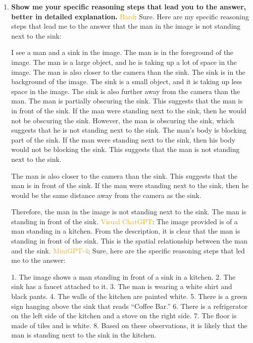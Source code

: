 \begin{enumerate}
    Therefore, the man in the image is not standing next to the sink. The man is standing in front of the sink.
    \subitem \textcolor{orange}{Visual ChatGPT}: The man is standing in front of the sink in the kitchen.
    \subitem \textcolor{orange}{MiniGPT-4}: Yes, the man is standing next to the sink.
    \item \textbf{Show me your specific reasoning steps that lead you to the answer, better in detailed explanation.}
    \subitem \textcolor{orange}{Bard}: 
    Sure. Here are my specific reasoning steps that lead me to the answer that the man in the image is not standing next to the sink:
    
    I see a man and a sink in the image.
    The man is in the foreground of the image. The man is a large object, and he is taking up a lot of space in the image. The man is also closer to the camera than the sink.
    The sink is in the background of the image. The sink is a small object, and it is taking up less space in the image. The sink is also further away from the camera than the man.
    The man is partially obscuring the sink. This suggests that the man is in front of the sink.
    If the man were standing next to the sink, then he would not be obscuring the sink. However, the man is obscuring the sink, which suggests that he is not standing next to the sink.
    The man's body is blocking part of the sink. If the man were standing next to the sink, then his body would not be blocking the sink. This suggests that the man is not standing next to the sink.
    
    The man is also closer to the camera than the sink. This suggests that the man is in front of the sink. If the man were standing next to the sink, then he would be the same distance away from the camera as the sink.
    
    Therefore, the man in the image is not standing next to the sink. The man is standing in front of the sink.
    \subitem \textcolor{orange}{Visual ChatGPT}: The image provided is of a man standing in a kitchen. From the description, it is clear that the man is standing in front of the sink. This is the spatial relationship between the man and the sink.
    \subitem \textcolor{orange}{MiniGPT-4}: Sure, here are the specific reasoning steps that led me to the answer:

    1. The image shows a man standing in front of a sink in a kitchen.
    2. The sink has a faucet attached to it.
    3. The man is wearing a white shirt and black pants.
    4. The walls of the kitchen are painted white.
    5. There is a green sign hanging above the sink that reads “Coffee Bar.”
    6. There is a refrigerator on the left side of the kitchen and a stove on the right side.
    7. The floor is made of tiles and is white.
    8. Based on these observations, it is likely that the man is standing next to the sink in the kitchen.
\end{enumerate}
